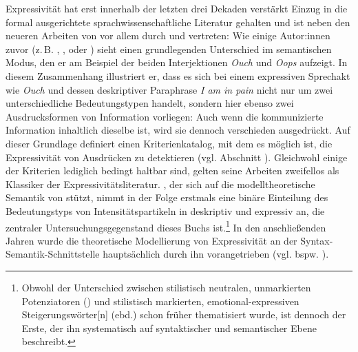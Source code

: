Expressivität hat erst innerhalb der letzten drei Dekaden verstärkt Einzug in die formal ausgerichtete sprachwissenschaftliche Literatur gehalten und ist neben den neueren Arbeiten von \citet[]{Gutzmann.2011, Gutzmann.2013a, Gutzmann.2019a} vor allem durch {\citet[]{Kaplan.1997}} und \citet[]{Potts.2007a,Potts.2007b} vertreten: Wie einige Autor:innen zuvor (z.\,B. \citealt[]{Hayner.1956}, \citealt[]{Buehler.1999}, \citealt[]{Jakobson.1960} oder \citealt[]{Cruse.1986}) sieht \citet[]{Kaplan.1997} einen grundlegenden Unterschied im semantischen Modus,
den er am Beispiel der beiden Interjektionen \textit{Ouch} und \textit{Oops} aufzeigt. In diesem Zusammenhang illustriert er, dass es sich bei einem expressiven Sprechakt wie \textit{Ouch} und dessen deskriptiver Paraphrase \textit{I am in pain} nicht nur um zwei unterschiedliche Bedeutungstypen handelt, 
sondern hier ebenso zwei Ausdrucksformen von Information vorliegen: Auch wenn die kommunizierte Information inhaltlich dieselbe ist, wird sie dennoch verschieden ausgedrückt. Auf dieser Grundlage definiert {\citet[]{Potts.2007a,Potts.2007b}} einen Kriterienkatalog, mit dem es möglich ist, die Expressivität von Ausdrücken zu detektieren (vgl. Abschnitt {}). Gleichwohl einige der Kriterien lediglich bedingt haltbar sind, gelten seine Arbeiten zweifellos als Klassiker der Expressivitätsliteratur. {\citet[]{Gutzmann.2011}}, der sich auf die modelltheoretische Semantik von \citet[]{Potts.2005} stützt, nimmt in der Folge erstmals eine binäre Einteilung des Bedeutungstyps von Intensitätspartikeln in deskriptiv und expressiv an, die zentraler Untersuchungsgegenstand dieses Buchs ist.\footnote{Obwohl der Unterschied zwischen \glqq{}stilistisch neutralen, unmarkierten Potenziatoren\grqq{} (\citealt[97]{Suscinskij.1985}) und \glqq{}stilistisch markierten, emotional-expressiven Steigerungswörter[n]\grqq{} (ebd.) schon früher thematisiert wurde, ist \citet[]{Gutzmann.2011} dennoch der Erste, der ihn systematisch auf syntaktischer und semantischer Ebene beschreibt.} In den anschließenden Jahren wurde die theoretische Modellierung von Expressivität an der Syntax-Semantik-Schnittstelle hauptsächlich durch ihn vorangetrieben (vgl. bspw.  \citealt[]{Gutzmann.2015a,Gutzmann.2019a}).

